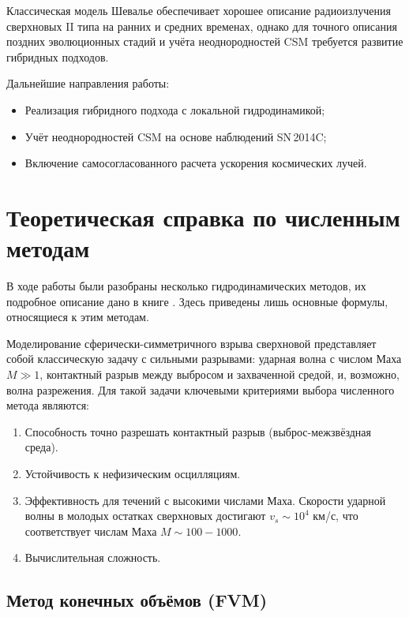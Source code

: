 \documentclass[a4paper,12pt]{extarticle}
\newcommand{\vs}{v_s}
\begin{document}
Классическая модель Шевалье обеспечивает хорошее описание радиоизлучения сверхновых II типа на ранних и средних временах, однако для точного описания поздних эволюционных стадий и учёта неоднородностей CSM требуется развитие гибридных подходов.

Дальнейшие направления работы:
\begin{itemize}
    \item Реализация гибридного подхода с локальной гидродинамикой;
    \item Учёт неоднородностей CSM на основе наблюдений SN\,2014C;
    \item Включение самосогласованного расчета ускорения космических лучей.
\end{itemize}

\newpage
\appendix
\section{Теоретическая справка по численным методам} \label{appendix:A}

В ходе работы были разобраны несколько гидродинамических методов, их подробное описание дано в книге \cite{toro2009}. Здесь приведены лишь основные формулы, относящиеся к этим методам.

Моделирование сферически-симметричного взрыва сверхновой представляет собой классическую задачу с сильными разрывами: ударная волна с числом Маха $M \gg 1$, контактный разрыв между выбросом и захваченной средой, и, возможно, волна разрежения. Для такой задачи ключевыми критериями выбора численного метода являются:

\begin{enumerate}
    \item Способность точно разрешать контактный разрыв (выброс-межзвёздная среда). 
    \item Устойчивость к нефизическим осцилляциям. 
    \item Эффективность для течений с высокими числами Маха. Скорости ударной волны в молодых остатках сверхновых достигают $\vs \sim 10^4$ км/с, что соответствует числам Маха $M \sim 100-1000$.
    \item Вычислительная сложность.
\end{enumerate}

\subsection{Метод конечных объёмов (FVM)}
\end{document}
